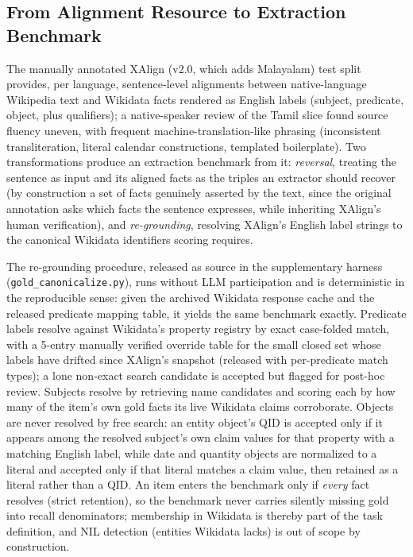 \documentclass{llncs}
\begin{document}
\subsection{From Alignment Resource to Extraction Benchmark}
The manually annotated XAlign (v2.0, which adds Malayalam) test split
provides, per language, sentence-level
alignments between native-language Wikipedia text and Wikidata facts rendered
as English labels (subject, predicate, object, plus qualifiers); a
native-speaker review of the Tamil slice found source fluency uneven, with
frequent machine-translation-like phrasing (inconsistent transliteration,
literal calendar constructions, templated boilerplate). Two transformations
produce an extraction benchmark from it: \emph{reversal},
treating the sentence as input and its aligned facts as the triples an
extractor should recover (by construction a set of facts genuinely asserted
by the text, since the original annotation asks which facts the sentence
expresses, while inheriting XAlign's human verification), and
\emph{re-grounding}, resolving XAlign's English label strings to the
canonical Wikidata identifiers scoring requires.

The re-grounding procedure, released as source in the supplementary harness
(\texttt{gold\_canonicalize.py}), runs without LLM participation and is
deterministic in the reproducible sense: given the archived Wikidata
response cache and the released predicate mapping table, it yields the same
benchmark exactly. Predicate labels
resolve against Wikidata's property registry by exact case-folded match,
with a 5-entry manually verified override table for the small closed set
whose labels have drifted since XAlign's snapshot (released with
per-predicate match types); a lone non-exact search candidate is accepted
but flagged for post-hoc review. Subjects resolve by retrieving name
candidates and scoring each by how many of the item's own gold facts its
live Wikidata claims corroborate. Objects are never resolved by free
search: an entity object's QID
is accepted only if it appears among the resolved subject's own claim values
for that property with a matching English label, while date and quantity
objects are normalized to a literal and accepted only if that literal
matches a claim value, then retained as a literal rather than a QID. An item
enters the benchmark only if \emph{every} fact resolves (strict retention),
so the benchmark never carries silently missing gold into recall
denominators; membership in Wikidata is thereby part of the task definition,
and NIL detection (entities Wikidata lacks) is out of scope by construction.
\end{document}
